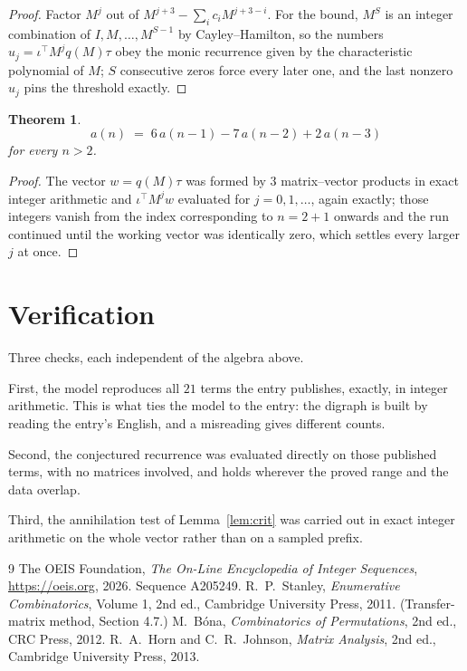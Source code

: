 \documentclass[11pt,a4paper]{article}
\theoremstyle{plain}
\newtheorem{theorem}{Theorem}
\theoremstyle{definition}
\begin{document}
\begin{proof}
Factor $M^{j}$ out of $M^{j+3}-\sum_ic_iM^{j+3-i}$. For the bound, $M^{S}$
is an integer combination of $I,M,\dots,M^{S-1}$ by Cayley--Hamilton, so the numbers
$u_j=\iota^{\!\top}M^{j}q(M)\tau$ obey the monic recurrence given by the characteristic
polynomial of $M$; $S$ consecutive zeros force every later one, and the last nonzero $u_j$
pins the threshold exactly.
\end{proof}

\begin{theorem}
\[
a(n)\;=\;6\,a(n-1) - 7\,a(n-2) + 2\,a(n-3)
\]
for every $n>2$.
\end{theorem}

\begin{proof}
The vector $w=q(M)\tau$ was formed by $3$ matrix--vector products in exact integer
arithmetic and $\iota^{\!\top}M^{j}w$ evaluated for $j=0,1,\dots$, again exactly; those
integers vanish from the index corresponding to $n=2+1$ onwards and the run continued
until the working vector was identically zero, which settles every larger $j$ at once.
\end{proof}

\section{Verification}

Three checks, each independent of the algebra above.

First, the model reproduces all $21$ terms the entry publishes, exactly, in integer
arithmetic. This is what ties the model to the entry: the digraph is built by reading the
entry's English, and a misreading gives different counts.

Second, the conjectured recurrence was evaluated directly on those published terms, with no
matrices involved, and holds wherever the proved range and the data overlap.

Third, the annihilation test of Lemma~\ref{lem:crit} was carried out in exact integer
arithmetic on the whole vector rather than on a sampled prefix.

\begin{thebibliography}{9}
 The OEIS Foundation, \emph{The On-Line Encyclopedia of Integer
Sequences}, \url{https://oeis.org}, 2026. Sequence A205249.
 R.~P.~Stanley, \emph{Enumerative Combinatorics}, Volume 1, 2nd ed.,
Cambridge University Press, 2011. (Transfer-matrix method, Section 4.7.)
 M.~B\'ona, \emph{Combinatorics of Permutations}, 2nd ed., CRC
Press, 2012.
 R.~A.~Horn and C.~R.~Johnson, \emph{Matrix Analysis}, 2nd ed., Cambridge
University Press, 2013.
\end{thebibliography}
\end{document}
